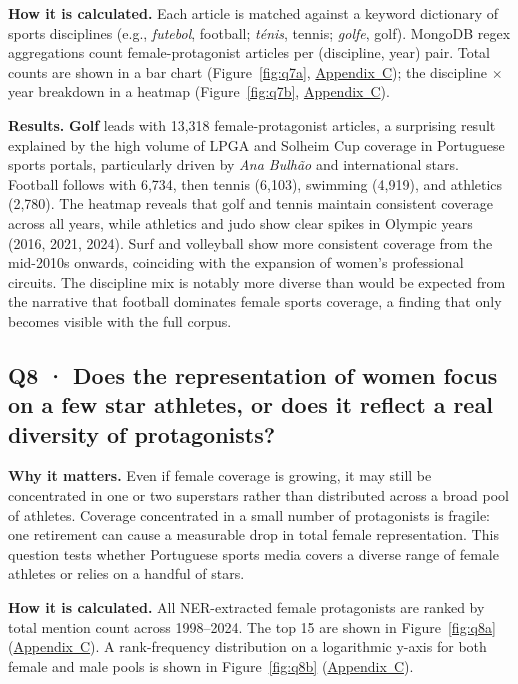 \documentclass[11pt,a4paper]{article}
\begin{document}
\textbf{How it is calculated.} Each article is matched against a keyword dictionary of sports disciplines (e.g., \textit{futebol}, football; \textit{ténis}, tennis; \textit{golfe}, golf). MongoDB regex aggregations count female-protagonist articles per (discipline, year) pair. Total counts are shown in a bar chart (Figure~\ref{fig:q7a}, \hyperref[app:figures]{Appendix~C}); the discipline $\times$ year breakdown in a heatmap (Figure~\ref{fig:q7b}, \hyperref[app:figures]{Appendix~C}).

\textbf{Results.} \textbf{Golf} leads with 13{,}318 female-protagonist articles, a surprising result explained by the high volume of LPGA and Solheim Cup coverage in Portuguese sports portals, particularly driven by \textit{Ana Bulhão} and international stars. Football follows with 6{,}734, then tennis (6{,}103), swimming (4{,}919), and athletics (2{,}780). The heatmap reveals that golf and tennis maintain consistent coverage across all years, while athletics and judo show clear spikes in Olympic years (2016, 2021, 2024). Surf and volleyball show more consistent coverage from the mid-2010s onwards, coinciding with the expansion of women's professional circuits. The discipline mix is notably more diverse than would be expected from the narrative that football dominates female sports coverage, a finding that only becomes visible with the full corpus.

\subsection[Q8 · Star concentration vs.\ diversity of protagonists]{Q8 · Does the representation of women focus on a few star athletes, or does it reflect a real diversity of protagonists?}

\textbf{Why it matters.} Even if female coverage is growing, it may still be concentrated in one or two superstars rather than distributed across a broad pool of athletes. Coverage concentrated in a small number of protagonists is fragile: one retirement can cause a measurable drop in total female representation. This question tests whether Portuguese sports media covers a diverse range of female athletes or relies on a handful of stars.

\textbf{How it is calculated.} All NER-extracted female protagonists are ranked by total mention count across 1998--2024. The top 15 are shown in Figure~\ref{fig:q8a} (\hyperref[app:figures]{Appendix~C}). A rank-frequency distribution on a logarithmic y-axis for both female and male pools is shown in Figure~\ref{fig:q8b} (\hyperref[app:figures]{Appendix~C}).
\end{document}
